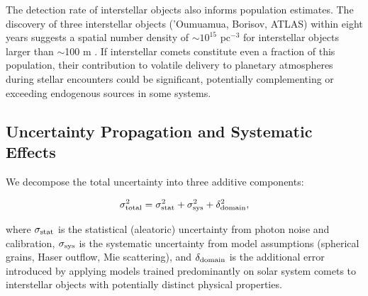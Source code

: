 \documentclass[preprint2]{aastex631}
\begin{document}
The detection rate of interstellar objects also informs population estimates. The discovery of three interstellar objects ('Oumuamua, Borisov, ATLAS) within eight years suggests a spatial number density of $\sim 10^{15}$ pc$^{-3}$ for interstellar objects larger than $\sim$100 m \citep{jewitt22}. If interstellar comets constitute even a fraction of this population, their contribution to volatile delivery to planetary atmospheres during stellar encounters could be significant, potentially complementing or exceeding endogenous sources in some systems.

\subsection{Uncertainty Propagation and Systematic Effects}

We decompose the total uncertainty into three additive components:

\begin{equation}
\sigma_{\rm total}^2 = \sigma_{\rm stat}^2 + \sigma_{\rm sys}^2 + \delta_{\rm domain}^2,
\end{equation}

where $\sigma_{\rm stat}$ is the statistical (aleatoric) uncertainty from photon noise and calibration, $\sigma_{\rm sys}$ is the systematic uncertainty from model assumptions (spherical grains, Haser outflow, Mie scattering), and $\delta_{\rm domain}$ is the additional error introduced by applying models trained predominantly on solar system comets to interstellar objects with potentially distinct physical properties.
\end{document}
